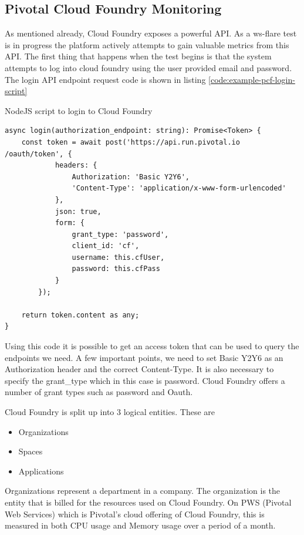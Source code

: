 \subsection{Pivotal Cloud Foundry Monitoring}

As mentioned already, Cloud Foundry exposes a powerful API. As a ws-flare test is in progress the platform actively attempts to gain valuable metrics from this API. The first thing that happens when the test begins is that the system attempts to log into cloud foundry using the user provided email and password. The login API endpoint request code is shown in listing \ref{code:example-pcf-login-script}

\begin{listing}[H]
    \caption{NodeJS script to login to Cloud Foundry}
    \label{code:example-pcf-login-script}
    \begin{verbatim}
async login(authorization_endpoint: string): Promise<Token> {
    const token = await post('https://api.run.pivotal.io
/oauth/token', {
            headers: {
                Authorization: 'Basic Y2Y6',
                'Content-Type': 'application/x-www-form-urlencoded'
            },
            json: true,
            form: {
                grant_type: 'password',
                client_id: 'cf',
                username: this.cfUser,
                password: this.cfPass
            }
        });

    return token.content as any;
}
\end{verbatim}
\end{listing}

Using this code it is possible to get an access token that can be used to query the endpoints we need. A few important points, we need to set Basic Y2Y6 as an Authorization header and the correct Content-Type. It is also necessary to specify the grant\_type which in this case is password. Cloud Foundry offers a number of grant types such as password and Oauth. 

Cloud Foundry is split up into 3 logical entities. These are

\begin{itemize}
  \item Organizations
  \item Spaces
  \item Applications
\end{itemize}

Organizations represent a department in a company. The organization is the entity that is billed for the resources used on Cloud Foundry. On PWS (Pivotal Web Services) which is Pivotal's cloud offering of Cloud Foundry, this is measured in both CPU usage and Memory usage over a period of a month.

